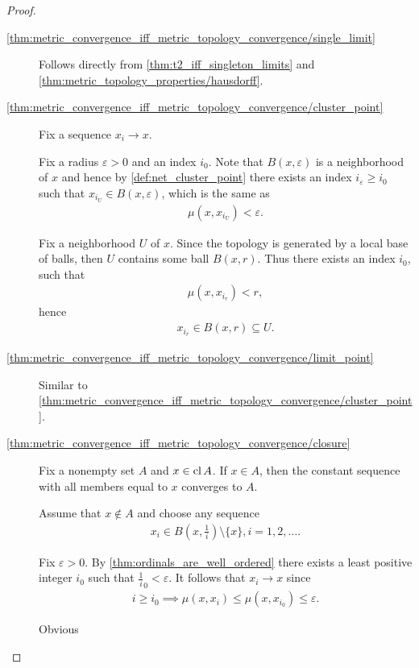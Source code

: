 \begin{proof}
  \begin{description}
    \item[\ref{thm:metric_convergence_iff_metric_topology_convergence/single_limit}] Follows directly from \cref{thm:t2_iff_singleton_limits} and \cref{thm:metric_topology_properties/hausdorff}.

    \item[\ref{thm:metric_convergence_iff_metric_topology_convergence/cluster_point}] Fix a sequence $x_i \to x$.

    \Implies Fix a radius $\varepsilon > 0$ and an index $i_0$. Note that $B(x, \varepsilon)$ is a neighborhood of $x$ and hence by \cref{def:net_cluster_point} there exists an index $i_\varepsilon \geq i_0$ such that $x_{i_U} \in B(x, \varepsilon)$, which is the same as
    \begin{align*}
      \mu(x, x_{i_U}) < \varepsilon.
    \end{align*}

    \ImpliedBy Fix a neighborhood $U$ of $x$. Since the topology is generated by a local base of balls, then $U$ contains some ball $B(x, r)$. Thus there exists an index $i_0$, such that
    \begin{align*}
      \mu(x, x_{i_r}) < r,
    \end{align*}
    hence
    \begin{align*}
      x_{i_r} \in B(x, r) \subseteq U.
    \end{align*}

    \item[\ref{thm:metric_convergence_iff_metric_topology_convergence/limit_point}] Similar to \ref{thm:metric_convergence_iff_metric_topology_convergence/cluster_point}.

    \item[\ref{thm:metric_convergence_iff_metric_topology_convergence/closure}]
    \Implies Fix a nonempty set $A$ and $x \in \operatorname{cl} A$. If $x \in A$, then the constant sequence with all members equal to $x$ converges to $A$.

    Assume that $x \not\in A$ and choose any sequence\AOC
    \begin{align*}
      x_i \in B(x, \tfrac 1 i) \setminus \{ x \}, i = 1, 2, \ldots.
    \end{align*}

    Fix $\varepsilon > 0$. By \cref{thm:ordinals_are_well_ordered} there exists a least positive integer $i_0$ such that $\tfrac 1 i_0 < \varepsilon$. It follows that $x_i \to x$ since
    \begin{align*}
      i \geq i_0 \implies \mu(x, x_i) \leq \mu(x, x_{i_0}) \leq \varepsilon.
    \end{align*}

    \ImpliedBy Obvious
  \end{description}
\end{proof}

